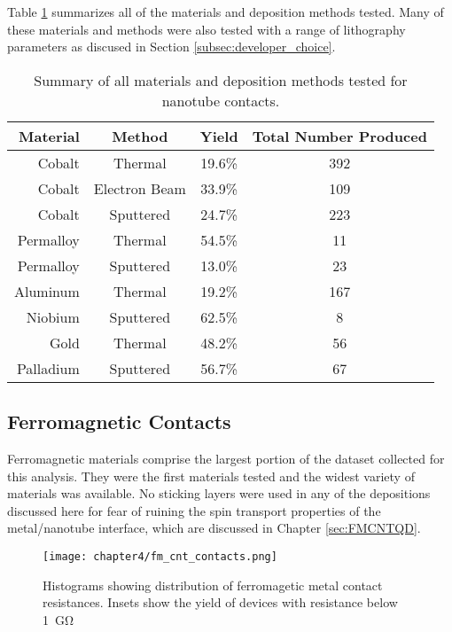 Table \ref{table:all_contact_results} summarizes all of the materials and deposition methods tested. Many of these materials and methods were also tested with a range of lithography parameters as discused in Section \ref{subsec:developer_choice}. 

\begin{table}
    \centering
    \caption{Summary of all materials and deposition methods tested for nanotube contacts.}
    \begin{tabular}{ r | c c c}
        Material & Method & Yield & Total Number Produced \\ \hline
        Cobalt & Thermal & 19.6\% & 392 \\ 
        Cobalt & Electron Beam & 33.9\% & 109 \\ 
        Cobalt & Sputtered & 24.7\% & 223 \\ 
        Permalloy & Thermal & 54.5\% & 11 \\
        Permalloy & Sputtered & 13.0\% & 23 \\
        Aluminum & Thermal & 19.2\% & 167 \\
        Niobium & Sputtered & 62.5\% & 8 \\
        Gold & Thermal & 48.2\% & 56 \\
        Palladium & Sputtered & 56.7\% & 67
    \end{tabular}
    \label{table:all_contact_results}  
\end{table}

\subsection{Ferromagnetic Contacts}

Ferromagnetic materials comprise the largest portion of the dataset collected for this analysis. They were the first materials tested and the widest variety of materials was available. No sticking layers were used in any of the depositions discussed here for fear of ruining the spin transport properties of the metal/nanotube interface, which are discussed in Chapter \ref{sec:FMCNTQD}.

\begin{figure}
    \centering
    \texttt{[image: chapter4/fm\_cnt\_contacts.png]}
    \caption{Histograms showing distribution of ferromagetic metal contact resistances. Insets show the yield of devices with resistance below \SI{1}{\giga\ohm}}
    \label{fig:fm_contacts}
\end{figure}


